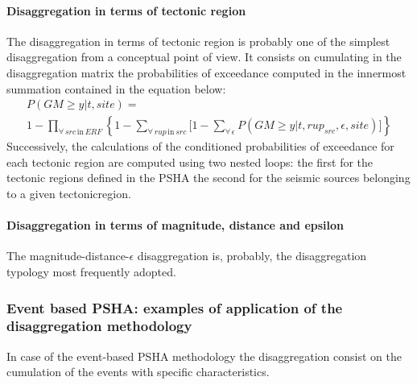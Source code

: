 \paragraph{Disaggregation in terms of tectonic region}
The disaggregation in terms of tectonic region is probably one of 
the simplest disaggregation from a conceptual point of view. 
%
It consists on cumulating in the disaggregation matrix the probabilities 
of exceedance computed in the innermost summation contained in the 
equation below:
\begin{multline}
P(GM \geq y|t,site) = \\
	1-\prod\limits_{\forall\,src\,\text{in}\,ERF}^{}  
	\left\{
		1-\sum\limits_{\forall\,rup\,\text{in}\,src}^{}
		\biggl[ 
			1-\sum\limits_{\forall\,\epsilon}^{} 
			P(GM \geq y|t,rup_{src},\epsilon,site)
		\biggr]
	\right\}
\label{eq:disaggregation_kernel}
\end{multline}
%
Successively, the calculations of the conditioned probabilities of 
exceedance for each tectonic region are computed using two nested
loops: the first for the tectonic regions defined in the PSHA the 
second for the seismic sources belonging to a given \gls{tectonicregion}. 
%
%
\paragraph{Disaggregation in terms of magnitude, distance and epsilon}
The magnitude-distance-$\epsilon$ disaggregation is, probably, the 
disaggregation typology most frequently adopted. 
%
\subsubsection{Event based PSHA: examples of application of the 
disaggregation methodology}
%
In case of the event-based PSHA methodology the disaggregation consist 
on the cumulation of the events with specific characteristics. 
